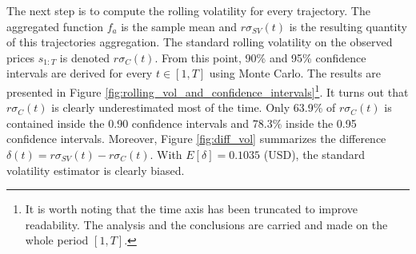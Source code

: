 \documentclass[11pt,a4,twosided,singlespacing,titlepagenumber=on]{scrreprt}
\numberwithin{equation}{chapter} %
\theoremstyle{remark}
\begin{document}
The next step is to compute the rolling volatility for every trajectory. The aggregated function $f_a$ is the sample mean and $r\sigma_{SV}(t)$ is the resulting quantity of this trajectories aggregation. The standard rolling volatility on the observed prices $s_{1:T}$ is denoted $r\sigma_C(t)$. From this point, 90\% and 95\% confidence intervals are derived for every $t \in [1,T]$ using Monte Carlo. The results are presented in Figure \ref{fig:rolling_vol_and_confidence_intervals}\footnote{It is worth noting that the time axis has been truncated to improve readability. The analysis and the conclusions are carried and made on the whole period $[1,T]$.}. It turns out that $r\sigma_C(t)$ is clearly underestimated most of the time. Only 63.9\% of $r\sigma_C(t)$ is contained inside the 0.90 confidence intervals and 78.3\% inside the 0.95 confidence intervals. Moreover, Figure \ref{fig:diff_vol} summarizes the difference $\delta(t) = r\sigma_{SV}(t) - r\sigma_C(t)$. With $E[\delta] = 0.1035$ (USD), the standard volatility estimator is clearly biased.
\end{document}
